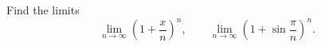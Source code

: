 \begin{exercise}
  \label{ex:hw07:power-sequence-limits}
  Find the limits
  \[
    \lim_{n\to\infty}\left(1+\frac xn\right)^n,\qquad
    \lim_{n\to\infty}\left(1+\sin\frac\pi n\right)^n.
  \]
\end{exercise}
